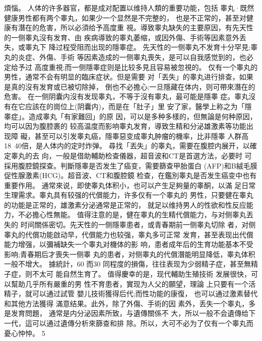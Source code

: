 \documentclass[12pt,UTF8]{ctexbook}
\begin{document}
煩惱。
人体的许多器官，都是成对配置以维持人類的重要功能，包括
睾丸·既然健康男性都有两个睾丸，如果少一个显然是不完整的，
也是不正常的，甚至对健康有潛在的危害，所以必須给予高度重
視。導致睾丸缺失的主要原因，有先天性的一侧睾丸沒有发育、由
疾病導致的睾丸萎缩，或因外傷、手術等因素意外丢失，或睾丸下
降过程受阻而出现的隱睾症。
先天性的一侧睾丸不发育十分罕見;睾丸的炎症、外傷、手術
等因素造成的一侧睾丸喪失，是可以自我感觉到的，也必定给予过
高度重視;而一侧隱睾症则是比较多見且容易被忽視的。
仅有一个睾丸的男性，通常不会有明显的臨床症状。但是需要
对「丟失」的睾丸进行排查，如果是真的沒有发育或已被切除掉，
倒也不必擔心;一旦隱藏在体内，则可帶來潛在的危害。
在一侧阴囊内沒有发现睾丸，不等于沒有睾丸，最可能是隱睾
症。睾丸沒有在它应該在的崗位上(阴囊内)，而是在「肚子」里
安了家，醫學上称之为「隱睾症」。造成睾丸「有家難回」的原
因，可以是多种多樣的，但無論是何种原因，均可以因为腹腔裹的
较高温度而影响睾丸发育，導致生精和分泌雄激素等功能出现障
礙，甚至可以引发睾丸癌，隱睾惡变成睾丸肿瘤的機率，比非隱睾
人群高18~40倍，是人体内的定时炸弹。
尋找「丟失」的睾丸，需要在腹腔内展开，以確定睾丸的去
向，一般是借助輔助检查儀器，超音波和CT是首選方法，必要时
可採用腹腔鏡探查。判斷隱睾是否发生了癌变，需要篩查甲胎蛋白
(AFP)和B絨毛膜促性腺激素(HCG)。超音波、CT和腹腔鏡
检查，在鑑別睾丸是否发生癌变中也有重要作用。
通常來说，即使睾丸体积小，也可以产生足夠量的睾酮，以滿
足日常生理需求。睾丸具有较强的代償能力，许多仅有一个睾丸的
男性，只要健在睾丸的功能是正常的，雄激素分泌通常是正常的，
就足以维持男人的性欲和性反应能力，不必擔心性無能。
值得注意的是，健在睾丸的生精代償能力，与对侧睾丸丟失的
时间關係密切。先天性的一侧隱睾患者，或青春期前一侧睾丸切除
者，对侧睾丸的代償功能啟动早，代償能力也较强，睾丸多可正常
发育，甚至表现出代償能力增强，以彌補缺失一个睾丸对機体的影
响，患者成年后的生育功能基本不受影响;青春期后才喪失一侧睾
丸的患者，对侧睾丸的代償潛能明显降低，睾丸体积一般不增大。
據統計，60%
而30%
同程度的損傷，往往表现为少弱精子症，甚至無精子症，则不太可
能自然生育了。
值得慶幸的是，现代輔助生殖技術
发展很快，可以幫助几乎所有嚴重的男
性不育患者，實现为人父的願望，理論
上只要有一个活精子，就可以通过試管
嬰儿技術獲得后代;而性功能的康復，
也可以通过激素替代和其他方法獲得
滿意结果。此外，除了外傷、手術的因
素外，丢失一个睾丸，多是发育問題，
通常是内分泌因素所致，与遺傳關係不
大，所以一般不会遺傳给下一代，這可以通过遺傳分析來篩查和排
除。所以，大可不必为了仅有一个睾丸而憂心忡忡。
5
\end{document}
